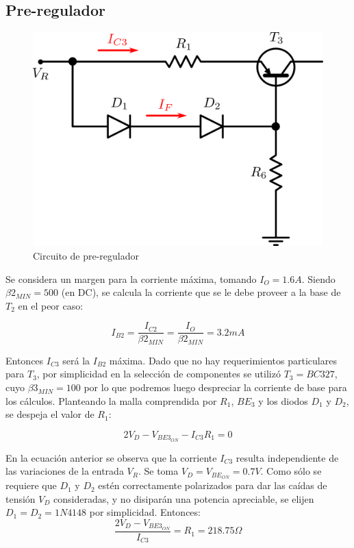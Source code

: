 \subsection{Pre-regulador}

\begin{figure}[!h]
\begin{centering}
\includegraphics[scale=0.5]{Imagenes/PreRegulador.png}
\par\end{centering}
\caption{Circuito de pre-regulador}

\end{figure}

Se considera un margen para la corriente m\'axima, tomando $I_O = 1.6A$. Siendo $\beta2_{MIN} = 500$ (en DC), se calcula la corriente que se le debe proveer a la base de $T_2$ en el peor caso:

$$I_{B2} = \frac{I_{C2}}{\beta2_{MIN}} = \frac{I_O}{\beta2_{MIN}}= 3.2mA$$

Entonces $I_{C3}$ ser\'a la $I_{B2}$ m\'axima. Dado que no hay requerimientos particulares para $T_3$, por simplicidad en la selecci\'on de componentes se utiliz\'o  $T_3 = BC327$, cuyo $\beta3_{MIN} = 100$ por lo que podremos luego despreciar la corriente de base para los c\'alculos. Planteando la malla comprendida por $R_1$, $BE_3$ y los diodos $D_1$ y $D_2$, se despeja el valor de $R_1$:

$$2V_D - V_{{BE3}_{ON}} - I_{C3}R_1 = 0$$
\par
En la ecuaci\'on anterior se observa que la corriente $I_{C3}$ resulta independiente de las variaciones de la entrada $V_R$. Se toma $V_D = V_{{BE}_{ON}} = 0.7V$. Como s\'olo se requiere que $D_1$ y $D_2$ est\'en correctamente polarizados para dar las ca\'idas de tensi\'on $V_D$ consideradas, y no disipar\'an una potencia apreciable, se elijen $D_1 = D_2 = 1N4148$ por simplicidad. Entonces:
$$\frac{2V_D - V_{{BE3}_{ON}}}{I_{C3}} = R_1 = 218.75\Omega$$

